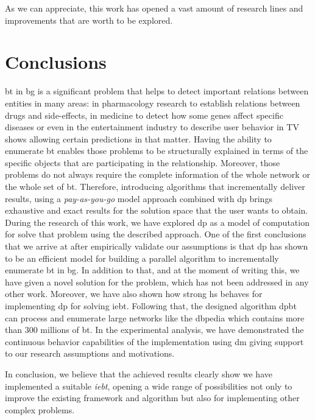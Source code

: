 As we can appreciate, this work has opened a vast amount of research lines and improvements that are worth to be explored.

\section{Conclusions}
\acrlong{bt} in \acrlong{bg} is a significant problem that helps to detect important relations between entities in many areas: in pharmacology research to establish relations between drugs and side-effects, in medicine to detect how some genes affect specific diseases
or even in the entertainment industry to describe user behavior in TV shows allowing certain predictions in that matter.
Having the ability to enumerate \acrlong{bt} enables those problems to be structurally explained in terms of the specific objects that are participating in the relationship.  
Moreover, those problems do not always require the complete information of the whole network or the whole set of \acrlong{bt}. 
Therefore, introducing algorithms that incrementally deliver results, using a \emph{pay-as-you-go} model approach combined with \acrshort{dp} brings exhaustive and exact results for the solution space that the user wants to obtain. 
During the research of this work, we have explored \acrfull{dp} as a model of computation for solve that problem using the described approach. 
One of the first conclusions that we arrive at after empirically validate our assumptions is that \acrlong{dp} has shown to be an efficient model for building a parallel algorithm to incrementally enumerate \acrlong{bt} in \acrlong{bg}. 
In addition to that, and at the moment of writing this, we have given a novel solution for the problem, which has not been addressed in any other work.
Moreover, we have also shown how strong \acrfull{hs} behaves for implementing \acrfull{dp} for solving \acrlong{iebt}. 
Following that, the designed algorithm \acrshort{dpbt} can process and enumerate large networks like the \acrlong{dbpedia} which contains more than $300$ millions of \acrlong{bt}.
In the experimental analysis, we have demonstrated the continuous behavior capabilities of the implementation using \acrlong{dm} giving support to our research assumptions and motivations. 

In conclusion, we believe that the achieved results clearly show we have implemented a suitable \emph{\acrlong{iebt}}, opening a wide range of possibilities not only to improve the existing framework and algorithm but also for implementing other complex problems.
